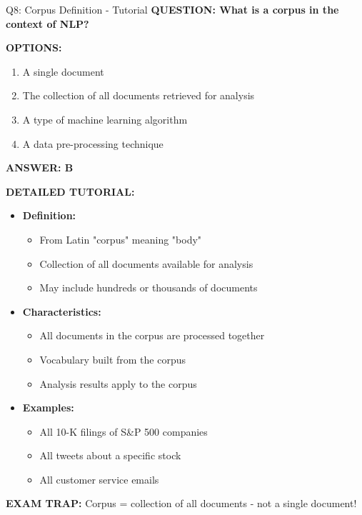 \documentclass[8pt]{beamer}
\begin{document}
	\begin{frame}{Q8: Corpus Definition - Tutorial}
		\fontsize{6.5}{7.5}\selectfont
		\textbf{QUESTION: What is a corpus in the context of NLP?}
		
		\vspace{0.1cm}
		\textbf{OPTIONS:}
		\begin{enumerate}
			\item A single document
			\item The collection of all documents retrieved for analysis
			\item A type of machine learning algorithm
			\item A data pre-processing technique
		\end{enumerate}
		
		\vspace{0.1cm}
		\textcolor{myblue}{\textbf{ANSWER: B}}
		
		\vspace{0.1cm}
		\textbf{DETAILED TUTORIAL:}
		\begin{itemize}
			\item \textbf{Definition:}
			\begin{itemize}
				\item From Latin "corpus" meaning "body"
				\item Collection of all documents available for analysis
				\item May include hundreds or thousands of documents
			\end{itemize}
			\item \textbf{Characteristics:}
			\begin{itemize}
				\item All documents in the corpus are processed together
				\item Vocabulary built from the corpus
				\item Analysis results apply to the corpus
			\end{itemize}
			\item \textbf{Examples:}
			\begin{itemize}
				\item All 10-K filings of S\&P 500 companies
				\item All tweets about a specific stock
				\item All customer service emails
			\end{itemize}
		\end{itemize}
		
		\textcolor{myred}{\textbf{EXAM TRAP:}} Corpus = \textcolor{myblue}{collection of all documents} - not a single document!
	\end{frame}
	
\end{document}
